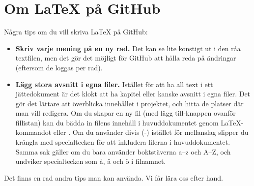 \section{Om LaTeX på GitHub}

Några tips om du vill skriva LaTeX på GitHub:

\begin{itemize}

\item \textbf{Skriv varje mening på en ny rad.}
Det kan se lite konstigt ut i den råa textfilen, men det gör det möjligt för GitHub att hålla reda på ändringar (eftersom de loggas per rad).
\item \textbf{Lägg stora avsnitt i egna filer.}
Istället för att ha all text i ett jättedokument är det klokt att ha kapitel eller kanske avsnitt i egna filer.
Det gör det lättare att överblicka innehållet i projektet, och hitta de platser där man vill redigera.
Om du skapar en ny fil (med lägg till-knappen ovanför fillistan) kan du bädda in filens innehåll i huvuddokumentet genom LaTeX-kommandot \verbose{} eller \verbose{}.
Om du använder divis (-) istället för mellanslag slipper du krångla med specialtecken för att inkludera filerna i huvuddokumentet.
Samma sak gäller om du bara använder boktstäverna a--z och A--Z, och undviker specialtecken som å, ä och ö i filnamnet.

\end{itemize}

Det finns en rad andra tips man kan använda. Vi får lära oss efter hand.
